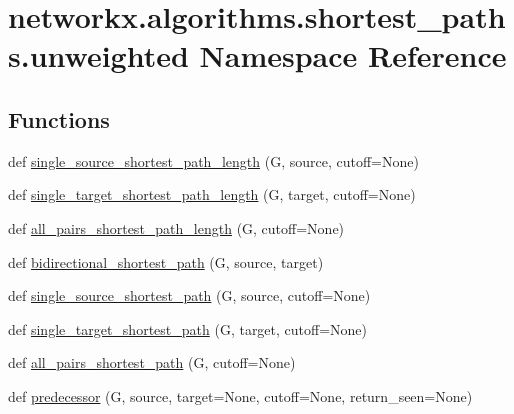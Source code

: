 \hypertarget{namespacenetworkx_1_1algorithms_1_1shortest__paths_1_1unweighted}{}\section{networkx.\+algorithms.\+shortest\+\_\+paths.\+unweighted Namespace Reference}
\label{namespacenetworkx_1_1algorithms_1_1shortest__paths_1_1unweighted}
\subsection*{Functions}
\begin{DoxyCompactItemize}
\item 
def \hyperlink{namespacenetworkx_1_1algorithms_1_1shortest__paths_1_1unweighted_ab8850fb3b6673b6b89af23eab6c72b6f}{single\+\_\+source\+\_\+shortest\+\_\+path\+\_\+length} (G, source, cutoff=None)
\item 
def \hyperlink{namespacenetworkx_1_1algorithms_1_1shortest__paths_1_1unweighted_a0e5fa6d9513e007e37df23b6d53bedbb}{single\+\_\+target\+\_\+shortest\+\_\+path\+\_\+length} (G, target, cutoff=None)
\item 
def \hyperlink{namespacenetworkx_1_1algorithms_1_1shortest__paths_1_1unweighted_ac9260ea54a81be0a03461317aa4622be}{all\+\_\+pairs\+\_\+shortest\+\_\+path\+\_\+length} (G, cutoff=None)
\item 
def \hyperlink{namespacenetworkx_1_1algorithms_1_1shortest__paths_1_1unweighted_aa5ec04fdd8442bb9261c266a31a75f75}{bidirectional\+\_\+shortest\+\_\+path} (G, source, target)
\item 
def \hyperlink{namespacenetworkx_1_1algorithms_1_1shortest__paths_1_1unweighted_a38f1b06d8b948cf3dc4d6e1a22e81211}{single\+\_\+source\+\_\+shortest\+\_\+path} (G, source, cutoff=None)
\item 
def \hyperlink{namespacenetworkx_1_1algorithms_1_1shortest__paths_1_1unweighted_a0a81a0f62206e34a3087502c69041446}{single\+\_\+target\+\_\+shortest\+\_\+path} (G, target, cutoff=None)
\item 
def \hyperlink{namespacenetworkx_1_1algorithms_1_1shortest__paths_1_1unweighted_a80914ca8e34b5cc1623e739b6e4eba82}{all\+\_\+pairs\+\_\+shortest\+\_\+path} (G, cutoff=None)
\item 
def \hyperlink{namespacenetworkx_1_1algorithms_1_1shortest__paths_1_1unweighted_a7d99327e99d49d8179e7b60fd48740a7}{predecessor} (G, source, target=None, cutoff=None, return\+\_\+seen=None)
\end{DoxyCompactItemize}



